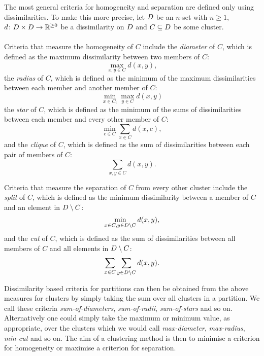 The most general criteria for homogeneity and separation are defined only
using dissimilarities.  To make this more precise, let $D$ be an $n$-set
with $n\geq 1$, $d \colon D \times D \to \mathbb{R}^{\geq 0}$ be a
dissimilarity on $D$ and $C \subseteq D$ be some cluster.
\\\\
\noindent Criteria that measure the homogeneity of $C$ include the
\textit{diameter} of $C$, which is defined as the maximum dissimilarity
between two members of $C$:
\begin{equation*}
  \max_{x,y \in C} d(x,y),
\end{equation*}
the \textit{radius} of $C$, which is defined as the minimum of the maximum
dissimilarities between each member and another member of $C$:
\begin{equation*}
  \min_{x \in C_i} \max_{y \in C} d(x,y)
\end{equation*}
the \textit{star} of $C$, which is defined as the minimum of the sums of
dissimilarities between each member and every other member of $C$:
\begin{equation*}
  \min_{c \in C} \sum_{x \in C} d(x,c),
\end{equation*}
and the \textit{clique} of $C$, which is defined as the sum of dissimilarities
between each pair of members of $C$:
\begin{equation*}
  \sum_{x,y \in C} d(x,y).
\end{equation*}

Criteria that measure the separation of $C$ from every other cluster include
the \textit{split} of $C$, which is defined as the minimum dissimilarity
between a member of $C$ and an element in $D \setminus C$:
\begin{equation*}
  \min_{x \in C, y \in D \setminus C} d(x,y),
\end{equation*}
and the \textit{cut} of $C$, which is defined as the sum of dissimilarities
between all members of $C$ and all elements in $D \setminus C$:
\begin{equation*}
  \sum_{x \in C} \sum_{y \in D \setminus C} d(x,y).
\end{equation*}

Dissimilarity based criteria for partitions can then be obtained from the
above measures for clusters by simply taking the sum over all clusters in a
partition.  We call these criteria \textit{sum-of-diameters},
\textit{sum-of-radii}, \textit{sum-of-stars} and so on.  Alternatively one
could simply take the maximum or minimum value, as appropriate, over the
clusters which we would call \textit{max-diameter}, \textit{max-radius},
\textit{min-cut} and so on.  The aim of a clustering method is then to
minimise a criterion for homogeneity or maximise a criterion for separation.

